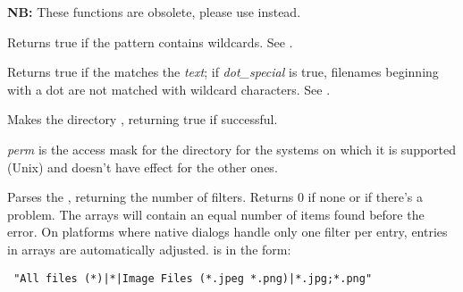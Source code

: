 

{\bf NB:} These functions are obsolete, please use\rtfsp
{}\rtfsp
instead.


\label{wxiswild}


Returns true if the pattern contains wildcards. See .


\label{wxmatchwild}


Returns true if the \/ matches the {\it text}\/; if {\it
dot\_special}\/ is true, filenames beginning with a dot are not matched
with wildcard characters. See .


\label{wxmkdir}


Makes the directory , returning true if successful.

{\it perm} is the access mask for the directory for the systems on which it is
supported (Unix) and doesn't have effect for the other ones.


\label{wxparsecommondialogsfilter}


Parses the , returning the number of filters.
Returns 0 if none or if there's a problem.
The arrays will contain an equal number of items found before the error.
On platforms where native dialogs handle only one filter per entry,
entries in arrays are automatically adjusted.
 is in the form:
\begin{verbatim}
 "All files (*)|*|Image Files (*.jpeg *.png)|*.jpg;*.png"
\end{verbatim}

